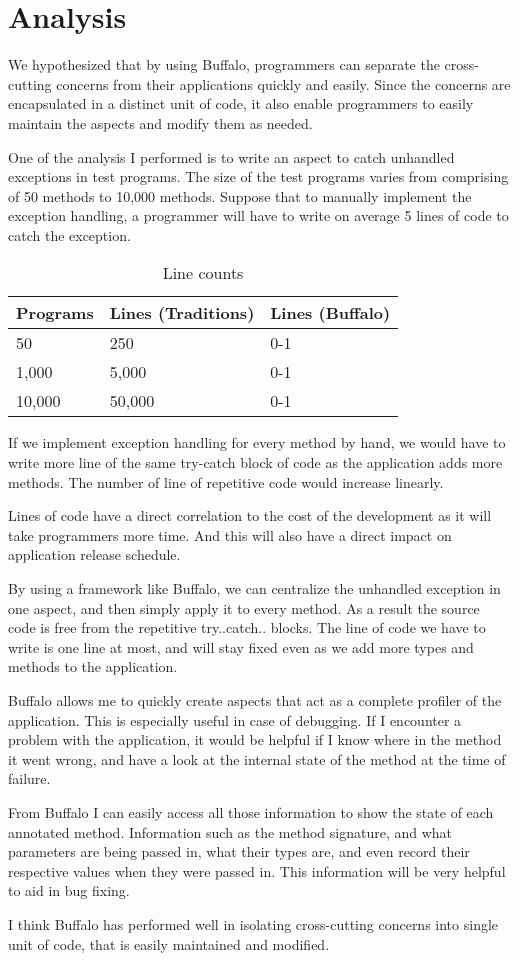 \chapter{Analysis}

We hypothesized that by using Buffalo, programmers can separate the cross-cutting concerns from their applications quickly and easily. Since the concerns are encapsulated in a distinct unit of code, it also enable programmers to easily maintain the aspects and modify them as needed.

One of the analysis I performed is to write an aspect to catch unhandled exceptions in test programs. The size of the test programs varies from comprising of 50 methods to 10,000 methods. Suppose that to manually implement the exception handling, a programmer will have to write on average 5 lines of code to catch the exception.

\begin{table}[H]
\centering
\begin{tabular}{|l|l|l|}
\hline
Programs & Lines (Traditions) & Lines (Buffalo)\\
\hline
50 & 250 & 0-1\\
1,000 & 5,000 & 0-1\\
10,000 & 50,000 & 0-1\\
\hline
\end{tabular}
\caption{Line counts}
\label{tab:lines_tbl}
\end{table}

If we implement exception handling for every method by hand, we would have to write more line of the same try-catch block of code as the application adds more methods. The number of line of repetitive code would increase linearly.

Lines of code have a direct correlation to the cost of the development as it will take programmers more time. And this will also have a direct impact on application release schedule.

By using a framework like Buffalo, we can centralize the unhandled exception in one aspect, and then simply apply it to every method. As a result the source code is free from the repetitive try..catch.. blocks. The line of code we have to write is one line at most, and will stay fixed even as we add more types and methods to the application.

Buffalo allows me to quickly create aspects that act as a complete profiler of the application. This is especially useful in case of debugging. If I encounter a problem with the application, it would be helpful if I know where in the method it went wrong, and have a look at the internal state of the method at the time of failure.

From Buffalo I can easily access all those information to show the state of each annotated method. Information such as the method signature, and what parameters are being passed in, what their types are, and even record their respective values when they were passed in. This information will be very helpful to aid in bug fixing.

I think Buffalo has performed well in isolating cross-cutting concerns into single unit of code, that is easily maintained and modified.
